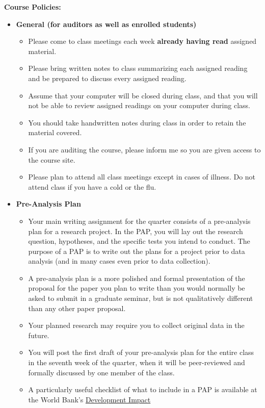 \documentclass[11pt]{article}
\begin{document}
\textbf {\large Course Policies:}
\begin{itemize}
	\item \textbf {General (for auditors as well as enrolled students)}
		\begin{itemize}
			\item Please come to class meetings each week \textbf{already having read} assigned material.
			\item Please bring written notes to class summarizing each assigned reading and be prepared to discuss every assigned reading. 
			\item Assume that your computer will be closed during class, and that you will not be able to review assigned
			readings on your computer during class. 
			\item You should take handwritten notes during class in order to retain the material covered. 
			\item If you are auditing the course, please inform me so you are given access to the course site. 
			\item Please plan to attend all class meetings except in cases of illness. Do not attend class if you have a cold or the flu. 
		\end{itemize}
		\item \textbf{Pre-Analysis Plan}
		\begin{itemize}
		\item Your main writing assignment for the quarter consists of a pre-analysis plan for a research project. In the PAP, you will lay out the research question, hypotheses, and the specific tests you intend to conduct. The purpose of a PAP is to write out
		the plans for a project prior to data analysis (and in many cases even prior to data collection).
		\item A pre-analysis plan is a more polished and formal presentation of the proposal for the paper you plan to write than you would normally be asked to submit in a graduate seminar, but is not qualitatively different than any other paper proposal. 
		\item Your planned research may require you to collect original data in the future. 
	\item You will post the first draft of your pre-analysis plan for the entire class in the seventh week of the quarter, when it will be peer-reviewed and
	formally discussed by one member of the class.  
		\item A particularly useful checklist of what to include in a PAP is available at the World Bank's \href{http://blogs.worldbank.org/impactevaluations/analysis-plan-checklist}{Development Impact 
}
\end{itemize}
\end{itemize}
\end{document}
